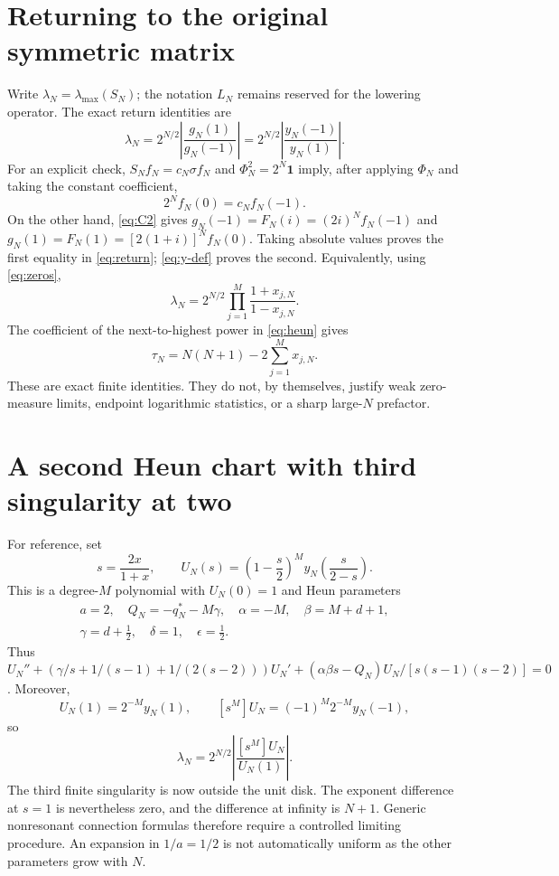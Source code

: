 \documentclass[11pt]{article}
\newcommand{\Id}{\mathbf 1}
\begin{document}
\section{Returning to the original symmetric matrix}
Write $\lambda_N=\lambda_{\max}(S_N)$; the notation $L_N$ remains
reserved for the lowering operator.
The exact return identities are
\begin{equation}\label{eq:return}
 \boxed{\lambda_N
 =2^{N/2}\left|\frac{g_N(1)}{g_N(-1)}\right|
 =2^{N/2}\left|\frac{y_N(-1)}{y_N(1)}\right|.}
\end{equation}
For an explicit check, $S_Nf_N=c_N\sigma f_N$ and $\Phi_N^2=2^N\Id$
imply, after applying $\Phi_N$ and taking the constant coefficient,
\[
 2^Nf_N(0)=c_Nf_N(-1).
\]
On the other hand, \eqref{eq:C2} gives
$g_N(-1)=F_N(i)=(2i)^Nf_N(-1)$ and
$g_N(1)=F_N(1)=[2(1+i)]^Nf_N(0)$.
Taking absolute values proves the first equality in \eqref{eq:return};
\eqref{eq:y-def} proves the second.
Equivalently, using \eqref{eq:zeros},
\begin{equation}
 \lambda_N=2^{N/2}\prod_{j=1}^M\frac{1+x_{j,N}}{1-x_{j,N}}.
\end{equation}
The coefficient of the next-to-highest power in \eqref{eq:heun} gives
\begin{equation}
 \tau_N=N(N+1)-2\sum_{j=1}^Mx_{j,N}.
\end{equation}
These are exact finite identities. They do not, by themselves, justify
weak zero-measure limits, endpoint logarithmic statistics, or a sharp
large-$N$ prefactor.

\section{A second Heun chart with third singularity at two}
For reference, set
\begin{equation}\label{eq:U}
 s=\frac{2x}{1+x},\qquad
 U_N(s)=\left(1-\frac s2\right)^M
 y_N\!\left(\frac{s}{2-s}\right).
\end{equation}
This is a degree-$M$ polynomial with $U_N(0)=1$ and Heun parameters
\begin{equation}\label{eq:U-par}
 \begin{gathered}
 a=2,\quad Q_N=-q_N^*-M\gamma,\quad
 \alpha=-M,\quad\beta=M+d+1,\\
 \gamma=d+\frac12,\quad\delta=1,\quad\epsilon=\frac12.
 \end{gathered}
\end{equation}
Thus $U_N''+(\gamma/s+1/(s-1)+1/(2(s-2)))U_N'
 +(\alpha\beta s-Q_N)U_N/[s(s-1)(s-2)]=0$.
Moreover,
\[
 U_N(1)=2^{-M}y_N(1),\qquad
 [s^M]U_N=(-1)^M2^{-M}y_N(-1),
\]
so
\begin{equation}
 \lambda_N=2^{N/2}\left|\frac{[s^M]U_N}{U_N(1)}\right|.
\end{equation}
The third finite singularity is now outside the unit disk. The
exponent difference at $s=1$ is nevertheless zero, and the difference
at infinity is $N+1$. Generic nonresonant connection formulas therefore
require a controlled limiting procedure. An expansion in $1/a=1/2$
is not automatically uniform as the other parameters grow with $N$.
\end{document}
